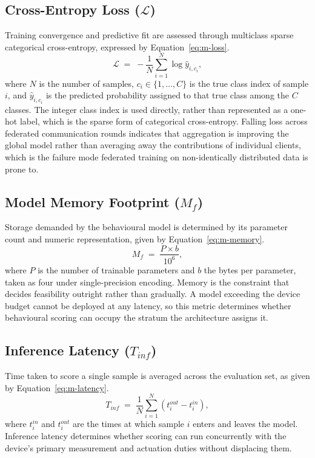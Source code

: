 \subsection{Cross-Entropy Loss ($\mathcal{L}$)}
\label{sec:metric-loss}

Training convergence and predictive fit are assessed through multiclass sparse
categorical cross-entropy, expressed by Equation~\eqref{eq:m-loss}.
\begin{equation}
\label{eq:m-loss}
\mathcal{L} \;=\; -\frac{1}{N} \sum_{i=1}^{N}
\log \hat{y}_{i,c_i} ,
\end{equation}
where $N$ is the number of samples, $c_i\in\{1,\ldots,C\}$ is the true class
index of sample $i$, and $\hat{y}_{i,c_i}$ is the predicted probability assigned
to that true class among the $C$ classes. The integer class index is used
directly, rather than represented as a one-hot label, which is the sparse form
of categorical cross-entropy. Falling loss across federated communication rounds
indicates that aggregation is improving the global model rather than averaging
away the contributions of individual clients, which is the failure mode
federated training on non-identically distributed data is prone to.

\subsection{Model Memory Footprint ($M_f$)}
\label{sec:metric-memory}

Storage demanded by the behavioural model is determined by its parameter count and numeric representation, given by Equation~\eqref{eq:m-memory}.
\begin{equation}
\label{eq:m-memory}
M_f \;=\; \frac{P \times b}{10^{6}} ,
\end{equation}
where $P$ is the number of trainable parameters and $b$ the bytes per parameter, taken as four under single-precision encoding. Memory is the constraint that decides feasibility outright rather than gradually. A model exceeding the device budget cannot be deployed at any latency, so this metric determines whether behavioural scoring can occupy the stratum the architecture assigns it.

\subsection{Inference Latency ($T_{inf}$)}
\label{sec:metric-latency}

Time taken to score a single sample is averaged across the evaluation set, as given by Equation~\eqref{eq:m-latency}.
\begin{equation}
\label{eq:m-latency}
T_{inf} \;=\; \frac{1}{N} \sum_{i=1}^{N} \left( t_i^{out} - t_i^{in} \right) ,
\end{equation}
where $t_i^{in}$ and $t_i^{out}$ are the times at which sample $i$ enters and leaves the model. Inference latency determines whether scoring can run concurrently with the device's primary measurement and actuation duties without displacing them.

